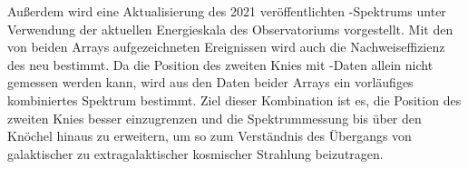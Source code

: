 Außerdem wird eine Aktualisierung des 2021 veröffentlichten -Spektrums unter Verwendung der aktuellen Energieskala des Observatoriums vorgestellt.
Mit den von beiden Arrays aufgezeichneten Ereignissen wird auch die Nachweiseffizienz des  neu bestimmt.
Da die Position des zweiten Knies mit -Daten allein nicht gemessen werden kann, wird aus den Daten beider Arrays ein vorläufiges kombiniertes Spektrum bestimmt.
Ziel dieser Kombination ist es, die Position des zweiten Knies besser einzugrenzen und die Spektrummessung bis über den Knöchel hinaus zu erweitern, um so zum Verständnis des Übergangs von galaktischer zu extragalaktischer kosmischer Strahlung beizutragen.

